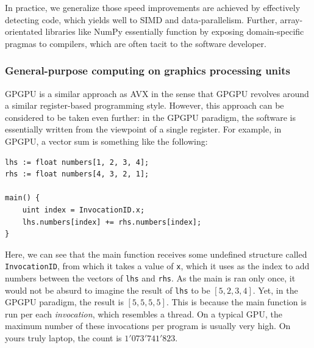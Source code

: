 \documentclass{IEEEtran}
\begin{document}
In practice, we generalize those speed improvements are achieved by effectively detecting code, which yields well to SIMD and data-parallelism. Further, array-orientated libraries like NumPy essentially function by exposing domain-specific pragmas to compilers, which are often tacit to the software developer.

\subsubsection{General-purpose computing on graphics processing units}
\label{ch:gpgpu}

\gls{GPGPU} is a similar approach as AVX in the sense that GPGPU revolves around a similar register-based programming style. However, this approach can be considered to be taken even further: in the GPGPU paradigm, the software is essentially written from the viewpoint of a single register. For example, in GPGPU, a vector sum is something like the following:

\begin{lstlisting}
lhs := float numbers[1, 2, 3, 4];
rhs := float numbers[4, 3, 2, 1];

main() {
    uint index = InvocationID.x;
    lhs.numbers[index] += rhs.numbers[index];
}
\end{lstlisting}

Here, we can see that the main function receives some undefined structure called \verb|InvocationID|, from which it takes a value of \verb|x|, which it uses as the index to add numbers between the vectors of \verb|lhs| and \verb|rhs|. As the main is ran only once, it would not be absurd to imagine the result of \verb|lhs| to be $[5, 2, 3, 4]$. Yet, in the GPGPU paradigm, the result is $[5, 5, 5, 5]$. This is because the main function is run per each \textit{invocation}, which resembles a thread. On a typical GPU, the maximum number of these invocations per program is usually very high. On yours truly laptop, the count is $1'073'741'823$.
\end{document}
